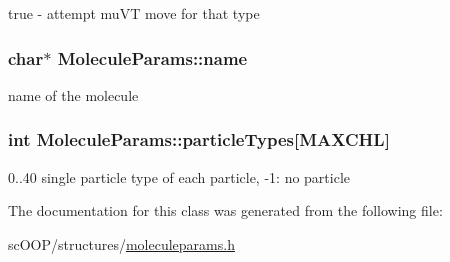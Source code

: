 true -\/ attempt mu\+V\+T move for that type 

\hypertarget{class_molecule_params_a9b478628f7e50569a41fdfb6dacfabfa}{
\subsubsection[{name}]{\setlength{\rightskip}{0pt plus 5cm}char$\ast$ Molecule\+Params\+::name}}\label{class_molecule_params_a9b478628f7e50569a41fdfb6dacfabfa}


name of the molecule 

\hypertarget{class_molecule_params_ae256d91fad543b30bb15c2c28cb8dadd}{
\subsubsection[{particle\+Types}]{\setlength{\rightskip}{0pt plus 5cm}int Molecule\+Params\+::particle\+Types\mbox{[}{\bf M\+A\+X\+C\+H\+L}\mbox{]}}}\label{class_molecule_params_ae256d91fad543b30bb15c2c28cb8dadd}


0..40 single particle type of each particle, -\/1\+: no particle 



The documentation for this class was generated from the following file\+:\begin{DoxyCompactItemize}
\item 
sc\+O\+O\+P/structures/\hyperlink{moleculeparams_8h}{moleculeparams.\+h}\end{DoxyCompactItemize}
